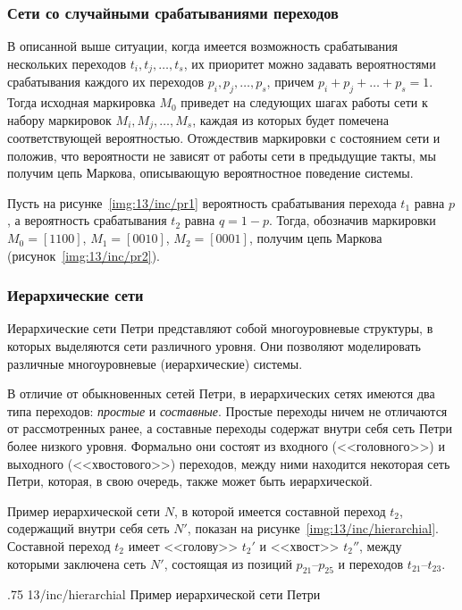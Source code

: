 \subsubsection{Сети со случайными срабатываниями переходов}

В описанной выше ситуации, когда имеется возможность срабатывания нескольких переходов ${t_i, t_j, \dots, t_s}$, их приоритет можно задавать вероятностями срабатывания каждого их переходов ${p_i, p_j, \dots, p_s}$, причем ${p_i + p_j + \dots + p_s = 1}$. Тогда исходная маркировка $M_0$ приведет на следующих шагах работы сети к набору маркировок ${M_i, M_j, \dots, M_s}$, каждая из которых будет помечена соответствующей вероятностью. Отождествив маркировки с состоянием сети и положив, что вероятности не зависят от работы сети в предыдущие такты, мы получим цепь Маркова, описывающую вероятностное поведение системы.

Пусть на рисунке~\ref{img:13/inc/pr1} вероятность срабатывания перехода $t_1$ равна $p$, а вероятность срабатывания $t_2$ равна ${q = 1 - p}$. Тогда, обозначив маркировки ${M_0 = [1100]}$, ${M_1 = [0010]}$, ${M_2 = [0001]}$, получим цепь Маркова (рисунок~\ref{img:13/inc/pr2}).

\subsubsection{Иерархические сети}

Иерархические сети Петри представляют собой многоуровневые структуры, в которых выделяются сети различного уровня. Они позволяют моделировать различные многоуровневые (иерархические) системы.

В отличие от обыкновенных сетей Петри, в иерархических сетях имеются два типа переходов: \textit{простые} и \textit{составные}. Простые переходы ничем не отличаются от рассмотренных ранее, а составные переходы содержат внутри себя сеть Петри более низкого уровня. Формально они состоят из входного (<<головного>>) и выходного (<<хвостового>>) переходов, между ними находится некоторая сеть Петри, которая, в свою очередь, также может быть иерархической.

Пример иерархической сети $N$, в которой имеется составной переход $t_2$, содержащий внутри себя сеть $N'$, показан на рисунке~\ref{img:13/inc/hierarchial}. Составной переход $t_2$ имеет <<голову>> $t_2'$ и <<хвост>> $t_2''$, между которыми заключена сеть $N'$, состоящая из позиций $p_{21}$--$p_{25}$ и переходов $t_{21}$--$t_{23}$.

\image
{.75\textwidth}
{13/inc/hierarchial}
{Пример иерархической сети Петри}

